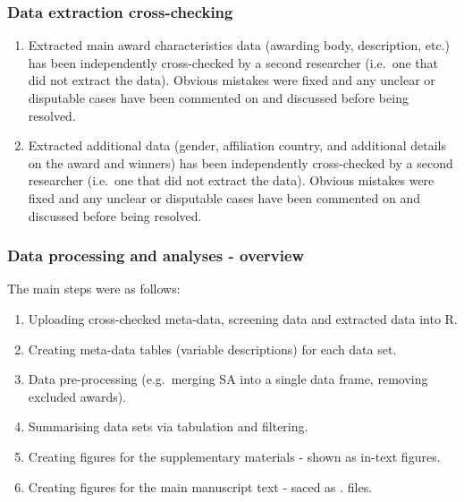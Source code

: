 \documentclass[
]{article}
\providecommand{\tightlist}{%
  \setlength{\itemsep}{0pt}\setlength{\parskip}{0pt}}
\begin{document}
\hypertarget{data-extraction-cross-checking}{%
\subsubsection{Data extraction
cross-checking}\label{data-extraction-cross-checking}}

\begin{enumerate}
\def\labelenumi{\arabic{enumi}.}
\item
  Extracted main award characteristics data (awarding body, description,
  etc.) has been independently cross-checked by a second researcher
  (i.e.~one that did not extract the data). Obvious mistakes were fixed
  and any unclear or disputable cases have been commented on and
  discussed before being resolved.
\item
  Extracted additional data (gender, affiliation country, and additional
  details on the award and winners) has been independently cross-checked
  by a second researcher (i.e.~one that did not extract the data).
  Obvious mistakes were fixed and any unclear or disputable cases have
  been commented on and discussed before being resolved.
\end{enumerate}

\hypertarget{data-processing-and-analyses---overview}{%
\subsubsection{Data processing and analyses -
overview}\label{data-processing-and-analyses---overview}}

The main steps were as follows:

\begin{enumerate}
\def\labelenumi{\arabic{enumi}.}
\tightlist
\item
  Uploading cross-checked meta-data, screening data and extracted data
  into R.\\
\item
  Creating meta-data tables (variable descriptions) for each data set.\\
\item
  Data pre-processing (e.g.~merging SA into a single data frame,
  removing excluded awards).\\
\item
  Summarising data sets via tabulation and filtering.\\
\item
  Creating figures for the supplementary materials - shown as in-text
  figures.\\
\item
  Creating figures for the main manuscript text - saced as . files.
\end{enumerate}
\end{document}
